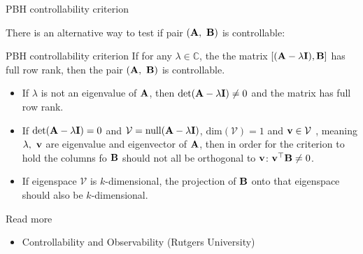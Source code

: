 \documentclass{beamer}
\begin{document}
\begin{frame}{PBH controllability criterion}
	\begin{flushleft}
		
		There is an alternative way to test if pair $(\mathbf{A}, \ \mathbf{B})$ is controllable:
		
		\begin{block}{PBH controllability criterion}
			If for any $\lambda \in \mathbb{C}$, the the matrix $[ (\mathbf{A}-\lambda\mathbf{I}), \mathbf{B}]$ has full row rank, then the pair $(\mathbf{A}, \ \mathbf{B})$ is controllable.
		\end{block}
		
		\begin{itemize}
			\item If $\lambda$ is not an eigenvalue of $\mathbf{A}$, then $\text{det}(\mathbf{A}-\lambda\mathbf{I}) \neq 0$ and the matrix has full row rank.
			
			\item If $\text{det}(\mathbf{A}-\lambda\mathbf{I}) = 0$ and $\mathcal{V} = \text{null}(\mathbf{A}-\lambda\mathbf{I})$, $\text{dim}(\mathcal{V}) = 1$ and $\mathbf{v} \in \mathcal{V}$ , meaning $\lambda, \ \mathbf{v}$ are eigenvalue and eigenvector of $\mathbf{A}$, then in order for the criterion to hold the columns fo $\mathbf{B}$ should not all be orthogonal to $\mathbf{v}$: $\mathbf{v}^\top \mathbf{B} \neq 0$.
			
			\item If eigenspace $\mathcal{V}$ is $k$-dimensional, the projection of $\mathbf{B}$ onto that eigenspace should also be $k$-dimensional.
			
		\end{itemize}
		
	\end{flushleft}
\end{frame}




\begin{frame}{Read more}
	
	\begin{itemize}
		
		\item Controllability and Observability (Rutgers University) 
		
	\end{itemize}
	
\end{frame}

\myqrframe
\end{document}
